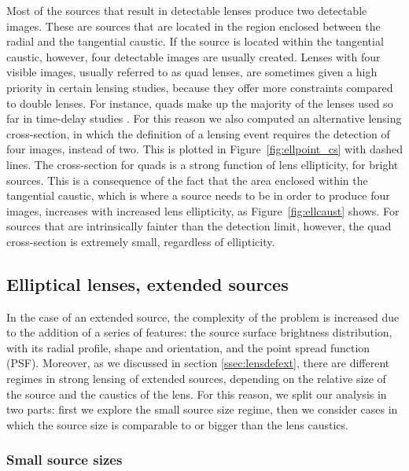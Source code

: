 \documentclass{aa}
\def\Fref#1{Figure~\ref{#1}\xspace}
\begin{document}
Most of the sources that result in detectable lenses produce two detectable images. These are sources that are located in the region enclosed between the radial and the tangential caustic. 
If the source is located within the tangential caustic, however, four detectable images are usually created.
Lenses with four visible images, usually referred to as quad lenses, are sometimes given a high priority in certain lensing studies, because they offer more constraints compared to double lenses. For instance, quads make up the majority of the lenses used so far in time-delay studies \citep{Mil++20}.
For this reason we also computed an alternative lensing cross-section, in which the definition of a lensing event requires the detection of four images, instead of two.
This is plotted in \Fref{fig:ellpoint_cs} with dashed lines.
The cross-section for quads is a strong function of lens ellipticity, for bright sources.
This is a consequence of the fact that the area enclosed within the tangential caustic, which is where a source needs to be in order to produce four images, increases with increased lens ellipticity, as \Fref{fig:ellcaust} shows.
For sources that are intrinsically fainter than the detection limit, however, the quad cross-section is extremely small, regardless of ellipticity.


\subsection{Elliptical lenses, extended sources}\label{ssec:ellext}

In the case of an extended source, the complexity of the problem is increased due to the addition of a series of features: the source surface brightness distribution, with its radial profile, shape and orientation, and the point spread function (PSF). 
Moreover, as we discussed in section \ref{ssec:lensdefext}, there are different regimes in strong lensing of extended sources, depending on the relative size of the source and the caustics of the lens.
For this reason, we split our analysis in two parts: first we explore the small source size regime, then we consider cases in which the source size is comparable to or bigger than the lens caustics.

\subsubsection{Small source sizes}
\end{document}
